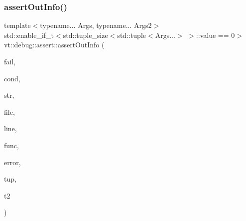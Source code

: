 \subsubsection{\texorpdfstring{assert\+Out\+Info()}{assertOutInfo()}\hspace{0.1cm}{\footnotesize\ttfamily [2/3]}}
{\footnotesize\ttfamily template$<$typename... Args, typename... Args2$>$ \\
std\+::enable\+\_\+if\+\_\+t$<$std\+::tuple\+\_\+size$<$std\+::tuple$<$Args...$>$ $>$\+::value == 0$>$ vt\+::debug\+::assert\+::assert\+Out\+Info (\begin{DoxyParamCaption}\item[{bool}]{fail,  }\item[{std\+::string const}]{cond,  }\item[{std\+::string const \&}]{str,  }\item[{std\+::string const \&}]{file,  }\item[{int const}]{line,  }\item[{std\+::string const \&}]{func,  }\item[{\hyperlink{namespacevt_a793764d753923abc3d32929870beb485}{Error\+Code\+Type}}]{error,  }\item[{\mbox{[}\mbox{[}maybe\+\_\+unused\mbox{]} \mbox{]} std\+::tuple$<$ Args2... $>$ \&\&}]{tup,  }\item[{std\+::tuple$<$ Args... $>$ \&\&}]{t2 }\end{DoxyParamCaption})\hspace{0.3cm}{\ttfamily [inline]}}

\mbox{\label{namespacevt_1_1debug_1_1assert_a4a74f966d45347110a86f76e821c3e7c}} 
